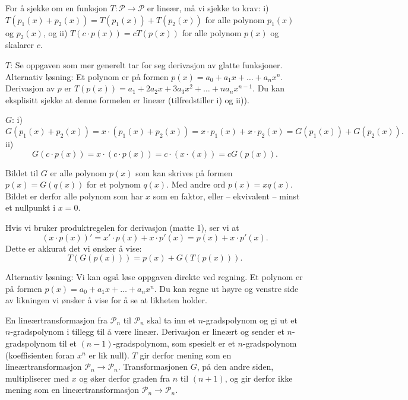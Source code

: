 \begin{losning}
\begin{punkt}
For å sjekke om en funksjon $T:\mathcal{P}\rightarrow \mathcal{P}$ er lineær, må vi sjekke to krav: i) $T(p_1(x)+p_2(x))=T(p_1(x))+T(p_2(x))$ for alle polynom $p_1(x)$ og $p_2(x)$, og ii) $T(c\cdot p(x))=cT(p(x))$ for alle polynom $p(x)$ og skalarer $c$.


\noindent
$T$: Se oppgaven som mer generelt tar for seg derivasjon av glatte funksjoner. Alternativ løsning: Et polynom er på formen $p(x)=a_0+a_1x+\dots +a_nx^n$. Derivasjon av $p$ er $T(p(x))=a_1+2a_2x+3a_3x^2+\dots+na_nx^{n-1}$. Du kan eksplisitt sjekke at denne formelen er lineær (tilfredstiller i) og ii)).


\noindent
$G$: i) $$G(p_1(x)+p_2(x))=x\cdot(p_1(x)+p_2(x))=x\cdot p_1(x)+x\cdot p_2(x)=G(p_1(x))+G(p_2(x)).$$ ii) $$G(c\cdot p(x))=x\cdot(c\cdot p(x))=c\cdot(x\cdotp(x))=cG(p(x)).$$


\end{punkt}

\begin{punkt}
Bildet til $G$ er alle polynom $p(x)$ som kan skrives på formen $p(x)=G(q(x))$ for et polynom $q(x)$. Med andre ord $p(x)=xq(x)$. Bildet er derfor alle polynom som har $x$ som en faktor, eller -- ekvivalent -- minst et nullpunkt i $x=0$.
\end{punkt}

\begin{punkt}
Hvis vi bruker produktregelen for derivasjon (matte 1), ser vi at 
$$(x\cdot p(x))'=x'\cdot p(x)+x\cdot p'(x)=p(x)+x\cdot p'(x).$$
Dette er akkurat det vi ønsker å vise:
$$T(G(p(x)))=p(x)+G(T(p(x))).$$

\noindent
Alternativ løsning: Vi kan også løse oppgaven direkte ved regning. Et polynom er på formen $p(x)=a_0+a_1x+\dots +a_nx^n$. Du kan regne ut høyre og venstre side av likningen vi ønsker å vise for å se at likheten holder.
\end{punkt}

\begin{punkt}
En lineærtransformasjon fra $\mathcal{P}_n$ til $\mathcal{P}_n$ skal ta inn et $n$-gradspolynom og gi ut et $n$-gradspolynom i tillegg til å være lineær. Derivasjon er lineært og sender et $n$-gradspolynom til et $(n-1)$-gradspolynom, som spesielt er et $n$-gradspolynom (koeffisienten foran $x^n$ er lik null). $T$ gir derfor mening som en lineærtransformasjon $\mathcal{P}_n\rightarrow \mathcal{P}_n$. Transformasjonen $G$, på den andre siden, multipliserer med $x$ og øker derfor graden fra $n$ til $(n+1)$, og gir derfor ikke mening som en lineærtransformasjon $\mathcal{P}_n\rightarrow \mathcal{P}_n$.


\end{punkt}
\end{losning}
